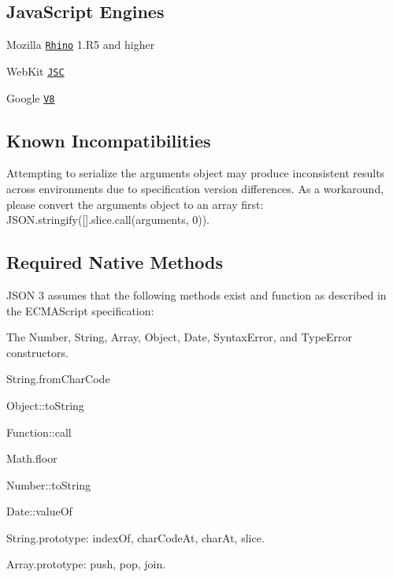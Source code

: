 \subsection*{Java\+Script Engines}


\begin{DoxyItemize}
\item Mozilla \href{http://www.mozilla.org/rhino}{\tt Rhino} 1.\+R5 and higher
\item Web\+Kit \href{https://trac.webkit.org/wiki/JSC}{\tt J\+SC}
\item Google \href{http://code.google.com/p/v8}{\tt V8}
\end{DoxyItemize}

\subsection*{Known Incompatibilities}


\begin{DoxyItemize}
\item Attempting to serialize the {\ttfamily arguments} object may produce inconsistent results across environments due to specification version differences. As a workaround, please convert the {\ttfamily arguments} object to an array first\+: {\ttfamily J\+S\+O\+N.\+stringify(\mbox{[}\mbox{]}.slice.\+call(arguments, 0))}.
\end{DoxyItemize}

\subsection*{Required Native Methods}

J\+S\+ON 3 assumes that the following methods exist and function as described in the E\+C\+M\+A\+Script specification\+:


\begin{DoxyItemize}
\item The {\ttfamily Number}, {\ttfamily String}, {\ttfamily Array}, {\ttfamily Object}, {\ttfamily Date}, {\ttfamily Syntax\+Error}, and {\ttfamily Type\+Error} constructors.
\item {\ttfamily String.\+from\+Char\+Code}
\item {\ttfamily Object\+::to\+String}
\item {\ttfamily Function\+::call}
\item {\ttfamily Math.\+floor}
\item {\ttfamily Number\+::to\+String}
\item {\ttfamily Date\+::value\+Of}
\item {\ttfamily String.\+prototype}\+: {\ttfamily index\+Of}, {\ttfamily char\+Code\+At}, {\ttfamily char\+At}, {\ttfamily slice}.
\item {\ttfamily Array.\+prototype}\+: {\ttfamily push}, {\ttfamily pop}, {\ttfamily join}.
\end{DoxyItemize}

